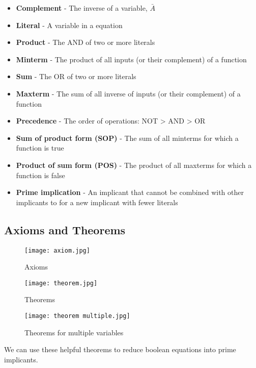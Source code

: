 \begin{definition}
    \begin{itemize}
        \item \textbf{Complement} - The inverse of a variable, $\bar{A}$
        \item \textbf{Literal} - A variable in a equation
        \item \textbf{Product} - The AND of two or more literals
        \item \textbf{Minterm} - The product of all inputs (or their complement) of a function
        \item \textbf{Sum} - The OR of two or more literals
        \item \textbf{Maxterm} - The sum of all inverse of inputs (or their complement) of a function
        \item \textbf{Precedence} - The order of operations: NOT > AND > OR
        \item \textbf{Sum of product form (SOP)} - The sum of all minterms for which a function is true
        \item \textbf{Product of sum form (POS)} - The product of all maxterms for which a function is false
        \item \textbf{Prime implication} - An implicant that cannot be combined with other implicants to for a new implicant with fewer literals
    \end{itemize}
\end{definition}

\subsection{Axioms and Theorems}

\begin{figure}[h]
    \centering
    \texttt{[image: axiom.jpg]}
    \caption{Axioms}
\end{figure}

\begin{figure}[h]
    \centering
    \texttt{[image: theorem.jpg]}
    \caption{Theorems}
\end{figure}

\begin{figure}[h]
    \centering
    \texttt{[image: theorem multiple.jpg]}
    \caption{Theorems for multiple variables}
\end{figure}

\pagebreak
We can use these helpful theorems to reduce boolean equations into prime implicants.

